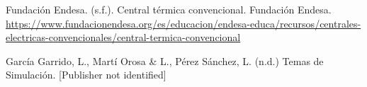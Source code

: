 \documentclass[twocolumn, fontsize=10pt]{article}
\begin{document}
\renewcommand\refname{Referencias}

\begin{thebibliography}{}

  \sloppypar
   Fundación Endesa. (s.f.). Central térmica convencional. Fundación Endesa. \url{https://www.fundacionendesa.org/es/educacion/endesa-educa/recursos/centrales-electricas-convencionales/central-termica-convencional}


   García Garrido, L., Martí Orosa \& L., Pérez Sánchez, L. (n.d.) Temas de Simulación. [Publisher not identified]

\end{thebibliography}
    
    
\end{document}

